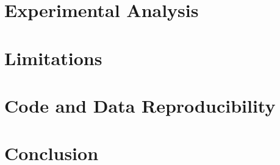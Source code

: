 \documentclass[sigconf, anonymous]{acmart}
\begin{document}
\section{Experimental Analysis}
\label{sec:analysis}


\section{Limitations}
\label{sec:limitations}

\section{Code and Data Reproducibility}
\label{sec:code}

\section{Conclusion}
\label{sec:conclusion}


\end{document}
